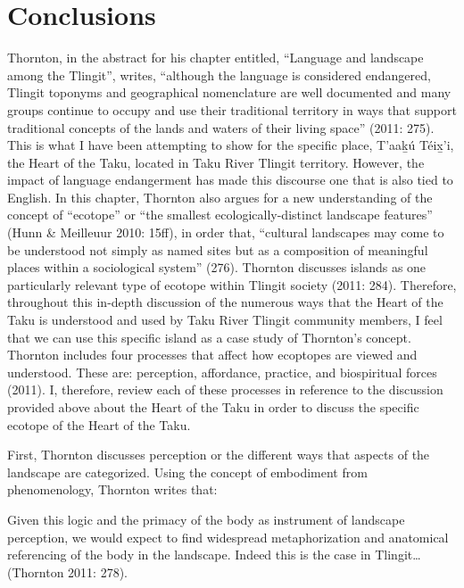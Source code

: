 \section{Conclusions}

Thornton, in the abstract for his chapter entitled, “Language and landscape among the Tlingit”, writes, “although the language is considered endangered, Tlingit toponyms and geographical nomenclature are well documented and many groups continue to occupy and use their traditional territory in ways that support traditional concepts of the lands and waters of their living space” (2011: 275). This is what I have been attempting to show for the specific place, T'aak̲ú Téix̲'i, the Heart of the Taku, located in Taku River Tlingit territory. However, the impact of language endangerment has made this discourse one that is also tied to English. In this chapter, Thornton also argues for a new understanding of the concept of “ecotope” or “the smallest ecologically-distinct landscape features” (Hunn \& Meilleuur 2010: 15ff), in order that, “cultural landscapes may come to be understood not simply as named sites but as a composition of meaningful places within a sociological system” (276). Thornton discusses islands as one particularly relevant type of ecotope within Tlingit society (2011: 284). Therefore, throughout this in-depth discussion of the numerous ways that the Heart of the Taku is understood and used by Taku River Tlingit community members, I feel that we can use this specific island as a case study of Thornton’s concept. Thornton includes four processes that affect how ecoptopes are viewed and understood. These are: perception, affordance, practice, and biospiritual forces (2011). I, therefore, review each of these processes in reference to the discussion provided above about the Heart of the Taku in order to discuss the specific ecotope of the Heart of the Taku.

First, Thornton discusses perception or the different ways that aspects of the landscape are categorized. Using the concept of embodiment from phenomenology, Thornton writes that:

Given this logic and the primacy of the body as instrument of landscape perception, we would expect to find widespread metaphorization and anatomical referencing of the body in the landscape. Indeed this is the case in Tlingit… (Thornton 2011: 278).

